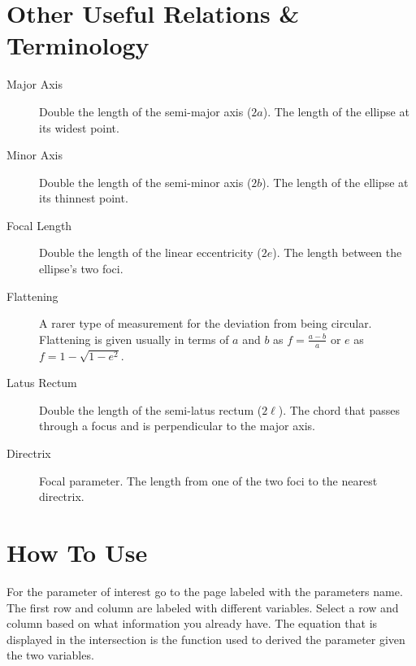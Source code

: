 \documentclass{article}
\begin{document}
\section*{Other Useful Relations \& Terminology}
\begin{description}
\item[Major Axis] Double the length of the semi-major axis ($2a$). The length of the ellipse at its widest point.
\item[Minor Axis] Double the length of the semi-minor axis ($2b$). The length of the ellipse at its thinnest point.
\item[Focal Length] Double the length of the linear eccentricity ($2e$). The length between the ellipse's two foci.
\item[Flattening] A rarer type of measurement for the deviation from being circular. Flattening is given usually in terms of $a$ and $b$ as $f=\frac{a-b}{a}$ or $e$ as $f=1-\sqrt{1-e^2}$. 
\item[Latus Rectum] Double the length of the semi-latus rectum ($2\ell$). The chord that passes through a focus and is perpendicular to the major axis.
\item[Directrix] Focal parameter. The length from one of the two foci to the nearest directrix. 
\end{description}

\section*{How To Use}
For the parameter of interest go to the page labeled with the parameters name. 
The first row and column are labeled with different variables. 
Select a row and column based on what information you already have. 
The equation that is displayed in the intersection is the function used to derived the parameter given the two variables.    
\newpage
\end{document}
